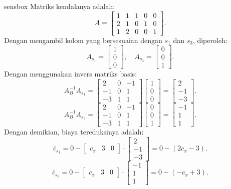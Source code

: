 \begin{steppanel}{sensbox}
Matriks kendalanya adalah:
\[
    A = \begin{bmatrix}
    1 & 1 & 1 & 0 & 0 \\
    2 & 1 & 0 & 1 & 0 \\
    1 & 2 & 0 & 0 & 1
    \end{bmatrix}.
\]
Dengan mengambil kolom yang bersesuaian dengan \( s_1 \) dan \( s_3 \), diperoleh:
\[
    A_{s_1} = \begin{bmatrix} 1 \\ 0 \\ 0 \end{bmatrix}, \quad
    A_{s_3} = \begin{bmatrix} 0 \\ 0 \\ 1 \end{bmatrix}.
\]
Dengan menggunakan invers matriks basis:
\[
    A_B^{-1} A_{s_1} =
    \begin{bmatrix}
    2 & 0 & -1 \\
    -1 & 0 & 1 \\
    -3 & 1 & 1
    \end{bmatrix}
    \begin{bmatrix} 1 \\ 0 \\ 0 \end{bmatrix} =
    \begin{bmatrix} 2 \\ -1 \\ -3 \end{bmatrix}.
\]
\[
    A_B^{-1} A_{s_3} =
    \begin{bmatrix}
    2 & 0 & -1 \\
    -1 & 0 & 1 \\
    -3 & 1 & 1
    \end{bmatrix}
    \begin{bmatrix} 0 \\ 0 \\ 1 \end{bmatrix} =
    \begin{bmatrix} -1 \\ 1 \\ 1 \end{bmatrix}.
\]
Dengan demikian, biaya tereduksinya adalah:
\[
    \bar{c}_{s_1} = 0 - \begin{bmatrix} c_x & 3 & 0 \end{bmatrix} \cdot \begin{bmatrix} 2 \\ -1 \\ -3 \end{bmatrix}
    = 0 - (2c_x - 3).
\]
\[
    \bar{c}_{s_3} = 0 - \begin{bmatrix} c_x & 3 & 0 \end{bmatrix} \cdot \begin{bmatrix} -1 \\ 1 \\ 1 \end{bmatrix}
    = 0 - (-c_x + 3).
\]
\end{steppanel}

